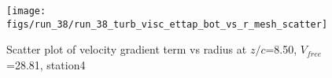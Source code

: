 \begin{figure}[H]
\centering
\texttt{[image: figs/run\_38/run\_38\_turb\_visc\_ettap\_bot\_vs\_r\_mesh\_scatter]}
\caption{Scatter plot of velocity gradient term vs radius at $z/c$=8.50, $V_{free}$=28.81, station4}
\label{fig:run_38_turb_visc_ettap_bot_vs_r_mesh_scatter}
\end{figure}


